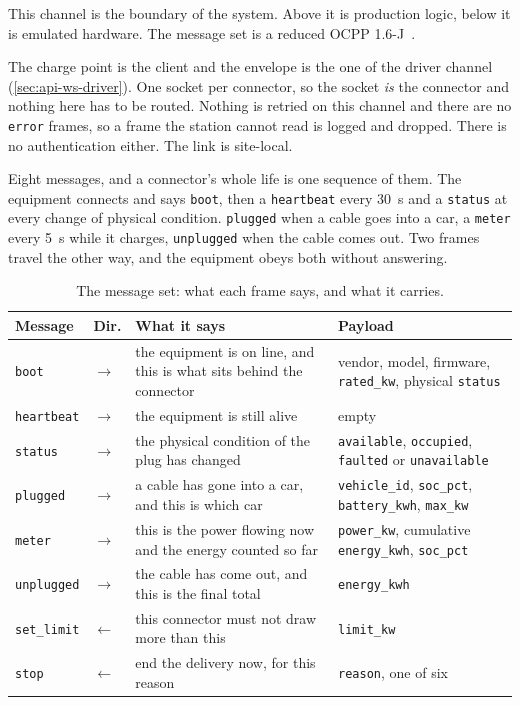 This channel is the boundary of the system. Above it is production logic, below it is
emulated hardware. The message set is a reduced OCPP 1.6-J~\cite{ocpp16j}.

The charge point is the client and the envelope is the one of the driver channel
(\cref{sec:api-ws-driver}). One socket per connector, so the socket \emph{is} the connector
and nothing here has to be routed. Nothing
is retried on this channel and there are no \texttt{error} frames, so a frame the station
cannot read is logged and dropped. There is no authentication either. The link is
site-local.

Eight messages, and a connector's whole life is one sequence of them. The equipment connects
and says \texttt{boot}, then a \texttt{heartbeat} every 30~s and a \texttt{status} at every
change of physical condition. \texttt{plugged} when a cable goes into a car, a \texttt{meter}
every 5~s while it charges, \texttt{unplugged} when the cable comes out. Two frames travel
the other way, and the equipment obeys both without answering.

\begin{table}[h]
\centering\small
\renewcommand{\arraystretch}{1.15}
\caption{The message set: what each frame says, and what it carries.}
\label{tab:cp-messages}
\begin{tabularx}{\textwidth}{@{}l l X >{\raggedright\arraybackslash}p{4.1cm}@{}}
\toprule
Message & Dir. & What it says & Payload \\
\midrule
\texttt{boot} & $\to$ & the equipment is on line, and this is what sits behind the
  connector & vendor, model, firmware, \texttt{rated\_kw}, physical \texttt{status} \\
\texttt{heartbeat} & $\to$ & the equipment is still alive & empty \\
\texttt{status} & $\to$ & the physical condition of the plug has changed &
  \texttt{available}, \texttt{occupied}, \texttt{faulted} or \texttt{unavailable} \\
\texttt{plugged} & $\to$ & a cable has gone into a car, and this is which car &
  \texttt{vehicle\_id}, \texttt{soc\_pct}, \texttt{battery\_kwh}, \texttt{max\_kw} \\
\texttt{meter} & $\to$ & this is the power flowing now and the energy counted so far &
  \texttt{power\_kw}, cumulative \texttt{energy\_kwh}, \texttt{soc\_pct} \\
\texttt{unplugged} & $\to$ & the cable has come out, and this is the final total &
  \texttt{energy\_kwh} \\
\texttt{set\_limit} & $\leftarrow$ & this connector must not draw more than this &
  \texttt{limit\_kw} \\
\texttt{stop} & $\leftarrow$ & end the delivery now, for this reason & \texttt{reason}, one
  of six \\
\bottomrule
\end{tabularx}
\end{table}

